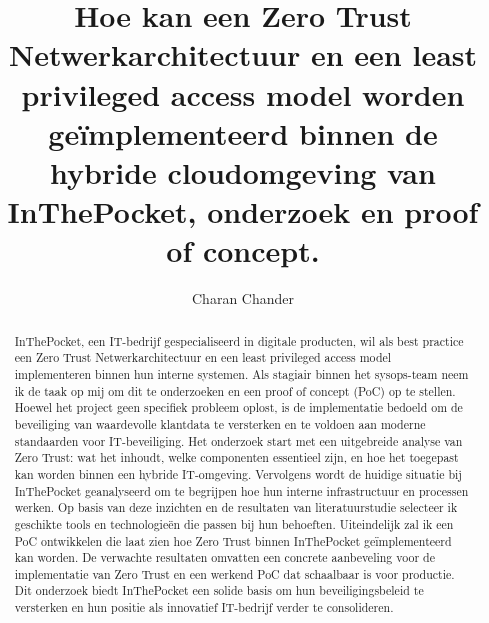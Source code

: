 \documentclass{hogent-article}
\title{Hoe kan een Zero Trust Netwerkarchitectuur en een least privileged access model worden geïmplementeerd binnen de hybride cloudomgeving van InThePocket, onderzoek en proof of concept.}
\author{Charan Chander}
\begin{document}
\begin{abstract}
  InThePocket, een IT-bedrijf gespecialiseerd in digitale producten, wil als best practice een Zero Trust Netwerkarchitectuur en een least privileged access model implementeren binnen hun interne systemen. Als stagiair binnen het sysops-team neem ik de taak op mij om dit te onderzoeken en een proof of concept (PoC) op te stellen. Hoewel het project geen specifiek probleem oplost, is de implementatie bedoeld om de beveiliging van waardevolle klantdata te versterken en te voldoen aan moderne standaarden voor IT-beveiliging.  
  Het onderzoek start met een uitgebreide analyse van Zero Trust: wat het inhoudt, welke componenten essentieel zijn, en hoe het toegepast kan worden binnen een hybride IT-omgeving. Vervolgens wordt de huidige situatie bij InThePocket geanalyseerd om te begrijpen hoe hun interne infrastructuur en processen werken. Op basis van deze inzichten en de resultaten van literatuurstudie selecteer ik geschikte tools en technologieën die passen bij hun behoeften. Uiteindelijk zal ik een PoC ontwikkelen die laat zien hoe Zero Trust binnen InThePocket geïmplementeerd kan worden.  
  De verwachte resultaten omvatten een concrete aanbeveling voor de implementatie van Zero Trust en een werkend PoC dat schaalbaar is voor productie. Dit onderzoek biedt InThePocket een solide basis om hun beveiligingsbeleid te versterken en hun positie als innovatief IT-bedrijf verder te consolideren.  
\end{abstract}

\tableofcontents



\printbibliography[heading=bibintoc]
\end{document}
